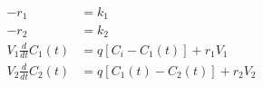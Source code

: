 \begin{equation}
  \begin{aligned}
    - r_1                  & = k_1
    \\
    - r_2                  & = k_2
    \label{eq:two_stirred_tank01_2}
    \\
    V_1 \frac{d}{dt}C_1(t) & = q [C_i - C_1(t)] + r_1 V_1
    \\
    V_2 \frac{d}{dt}C_2(t) & = q [C_1(t) - C_2(t)] + r_2 V_2
  \end{aligned}
\end{equation}